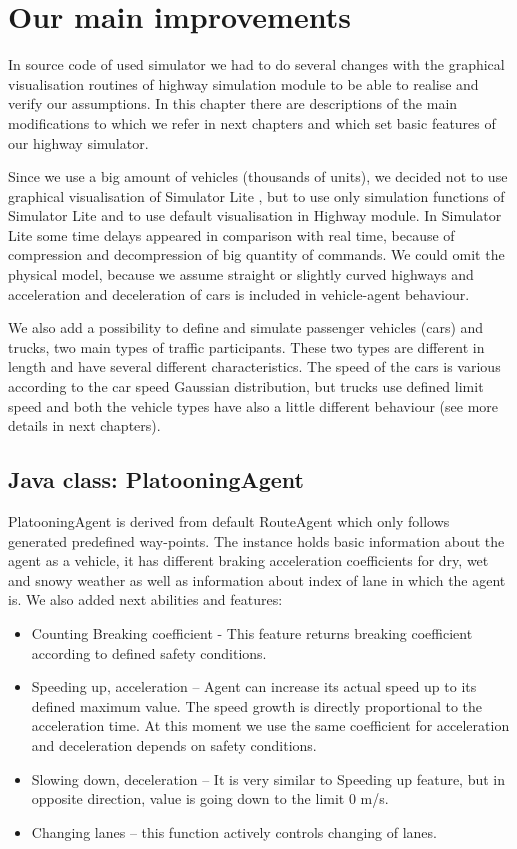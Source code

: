 \section{Our main improvements}

In source code of used simulator we had to do several changes with the graphical visualisation routines of highway simulation module to be able to realise and verify our assumptions. In this chapter there are descriptions of the main modifications to which we refer in next chapters and which set basic features of our highway simulator.

Since we use a big amount of vehicles (thousands of units), we decided not to use graphical visualisation of Simulator Lite , but to use only simulation functions of Simulator Lite and to use default visualisation in  Highway module. In Simulator Lite some time delays appeared in comparison with real time, because of compression and decompression of big quantity of commands. We could omit the physical model, because we assume straight or slightly curved highways and acceleration and deceleration of cars is included in vehicle-agent behaviour. 

We also add a possibility to define and simulate passenger vehicles (cars) and trucks, two main types of traffic participants. These two types are different in length and have several different characteristics. The speed of the cars is various according to the car speed Gaussian distribution, but trucks use defined limit speed and both the vehicle types have also a little different behaviour (see more details in next chapters).

\subsection{Java class: PlatooningAgent}

PlatooningAgent is derived from default RouteAgent which only follows generated predefined way-points. The instance holds basic information about the agent as a vehicle, it has different braking acceleration coefficients for dry, wet and snowy weather as well as information about index of lane in which the agent is.  We also added next abilities and features: 

\begin{itemize}
\item Counting Breaking coefficient - This feature returns breaking coefficient according to defined safety conditions.
\item Speeding up, acceleration – Agent can increase its actual speed up to its defined maximum value. The speed growth is directly proportional to the acceleration time. At this moment we use the same coefficient for acceleration and deceleration depends on safety conditions.
\item Slowing down, deceleration – It is very similar to Speeding up feature, but in opposite direction, value is going down to the limit 0 m/s.
\item Changing lanes – this function actively controls changing of lanes.  
\end{itemize}

